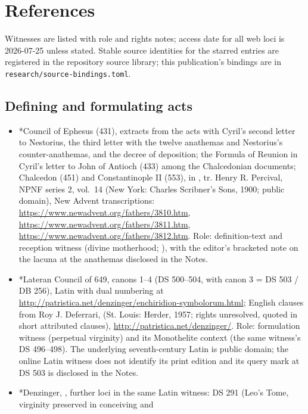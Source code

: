 \sectionguard
\section{References}

Witnesses are listed with role and rights notes; access date for all web
loci is 2026-07-25 unless stated. Stable source identities for the
starred entries are registered in the repository source library; this
publication's bindings are in \texttt{research/source-bindings.toml}.

\subsection*{Defining and formulating acts}

\begin{itemize}
\item *Council of Ephesus (431), extracts from the acts with Cyril's
second letter to Nestorius, the third letter with the twelve anathemas
and Nestorius's counter-anathemas, and the decree of deposition; the
Formula of Reunion in Cyril's letter to John of Antioch (433) among the
Chalcedonian documents; Chalcedon (451) and Constantinople II (553), in
, tr. Henry R. Percival, NPNF series
2, vol.~14 (New York: Charles Scribner's Sons, 1900; public domain), New
Advent transcriptions: \url{https://www.newadvent.org/fathers/3810.htm},
\url{https://www.newadvent.org/fathers/3811.htm},
\url{https://www.newadvent.org/fathers/3812.htm}. Role: definition-text
and reception witness (divine motherhood; ), with the
editor's bracketed note on the lacuna at the anathemas disclosed in the
Notes.
\item *Lateran Council of 649, canons 1--4 (DS 500--504, with canon 3 =
DS 503 / DB 256), Latin with dual numbering at
\url{http://patristica.net/denzinger/enchiridion-symbolorum.html};
English clauses from Roy J. Deferrari,  (St. Louis: Herder, 1957; rights unresolved, quoted in short
attributed clauses), \url{http://patristica.net/denzinger/}. Role:
formulation witness (perpetual virginity) and its Monothelite context
(the same witness's DS 496--498). The underlying seventh-century Latin is
public domain; the online Latin witness does not identify its print
edition and its query mark at DS 503 is disclosed in the Notes.
\item *Denzinger, , further loci in the same
Latin witness: DS 291 (Leo's Tome, virginity preserved in conceiving and

\end{itemize}
